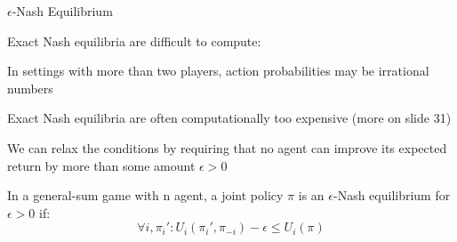 
    

  
  
  
    

\begin{frame}{\(\epsilon\)-Nash Equilibrium}

    Exact Nash equilibria are difficult to compute: 

    \blist
        \item In settings with more than two players, action probabilities may be irrational numbers
        \item Exact Nash equilibria are often computationally too expensive (more on slide 31)
        \item We can relax the conditions by requiring that no agent can improve its expected return by more than some amount $\epsilon > 0$
        \item In a general-sum game with n agent, a joint policy $\pi$ is an $\epsilon$-Nash equilibrium for $\epsilon > 0$ if:
    \elist
    \vspace{0pt}
    \begin{equation*}
        \forall i, \pi_{i}': U_{i}(\pi_{i}', \pi_{-i})-\epsilon \le U_i(\pi)
    \end{equation*}

\end{frame}

